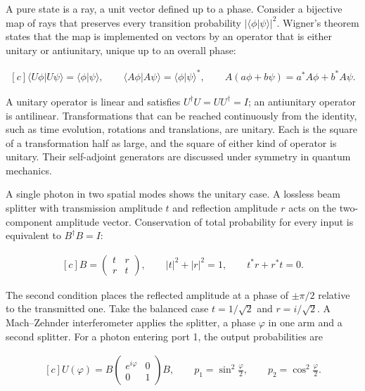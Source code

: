 \documentclass[11pt,oneside]{book}
\newenvironment{centeredalign}{\[\begin{gathered}[c]}{\end{gathered}\]}
\begin{document}
A pure state is a ray, a unit vector defined up to a phase. Consider a bijective map of rays that preserves every transition probability \(|\langle\phi|\psi\rangle|^2\). Wigner's theorem states that the map is implemented on vectors by an operator that is either unitary or antiunitary, unique up to an overall phase:

\begin{centeredalign}
\langle U\phi|U\psi\rangle=\langle\phi|\psi\rangle,\qquad
\langle A\phi|A\psi\rangle=\langle\phi|\psi\rangle^*,\qquad
A(a\phi+b\psi)=a^*A\phi+b^*A\psi.
\end{centeredalign}

A unitary operator is linear and satisfies \(U^\dagger U=UU^\dagger=I\); an antiunitary operator is antilinear. Transformations that can be reached continuously from the identity, such as time evolution, rotations and translations, are unitary. Each is the square of a transformation half as large, and the square of either kind of operator is unitary. Their self-adjoint generators are discussed under symmetry in quantum mechanics.

A single photon in two spatial modes shows the unitary case. A lossless beam splitter with transmission amplitude \(t\) and reflection amplitude \(r\) acts on the two-component amplitude vector. Conservation of total probability for every input is equivalent to \(B^\dagger B=I\):

\begin{centeredalign}
B=\begin{pmatrix}t&r\\r&t\end{pmatrix},\qquad |t|^2+|r|^2=1,\qquad t^*r+r^*t=0.
\end{centeredalign}

The second condition places the reflected amplitude at a phase of \(\pm\pi/2\) relative to the transmitted one. Take the balanced case \(t=1/\sqrt2\) and \(r=i/\sqrt2\). A Mach--Zehnder interferometer applies the splitter, a phase \(\varphi\) in one arm and a second splitter. For a photon entering port 1, the output probabilities are

\begin{centeredalign}
U(\varphi)=B\begin{pmatrix}e^{i\varphi}&0\\0&1\end{pmatrix}B,\qquad
p_1=\sin^2\frac\varphi2,\qquad p_2=\cos^2\frac\varphi2.
\end{centeredalign}
\end{document}
